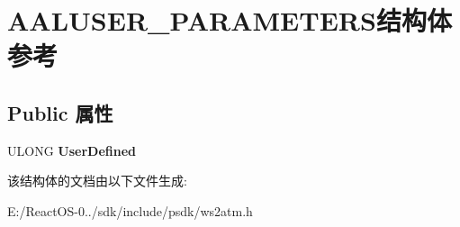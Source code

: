\hypertarget{struct_a_a_l_u_s_e_r___p_a_r_a_m_e_t_e_r_s}{}\section{A\+A\+L\+U\+S\+E\+R\+\_\+\+P\+A\+R\+A\+M\+E\+T\+E\+R\+S结构体 参考}
\label{struct_a_a_l_u_s_e_r___p_a_r_a_m_e_t_e_r_s}
\subsection*{Public 属性}
\begin{DoxyCompactItemize}
\item 
\mbox{\label{struct_a_a_l_u_s_e_r___p_a_r_a_m_e_t_e_r_s_a2268bd50b44a35edc07b27a355a80fee}} 
U\+L\+O\+NG {\bfseries User\+Defined}
\end{DoxyCompactItemize}


该结构体的文档由以下文件生成\+:\begin{DoxyCompactItemize}
\item 
E\+:/\+React\+O\+S-\/0../sdk/include/psdk/ws2atm.\+h\end{DoxyCompactItemize}
